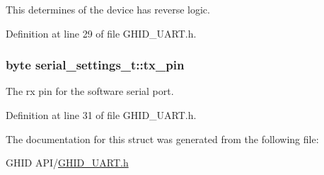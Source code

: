 \-This determines of the device has reverse logic. 



\-Definition at line 29 of file \-G\-H\-I\-D\-\_\-\-U\-A\-R\-T.\-h.

\hypertarget{structserial__settings__t_a0f93cf06b293d16a9988f160ff6bd796}{
\subsubsection[{tx\-\_\-pin}]{\setlength{\rightskip}{0pt plus 5cm}byte {\bf serial\-\_\-settings\-\_\-t\-::tx\-\_\-pin}}}\label{structserial__settings__t_a0f93cf06b293d16a9988f160ff6bd796}


\-The rx pin for the software serial port. 



\-Definition at line 31 of file \-G\-H\-I\-D\-\_\-\-U\-A\-R\-T.\-h.



\-The documentation for this struct was generated from the following file\-:\begin{DoxyCompactItemize}
\item 
\-G\-H\-I\-D A\-P\-I/\hyperlink{_g_h_i_d___u_a_r_t_8h}{\-G\-H\-I\-D\-\_\-\-U\-A\-R\-T.\-h}\end{DoxyCompactItemize}
